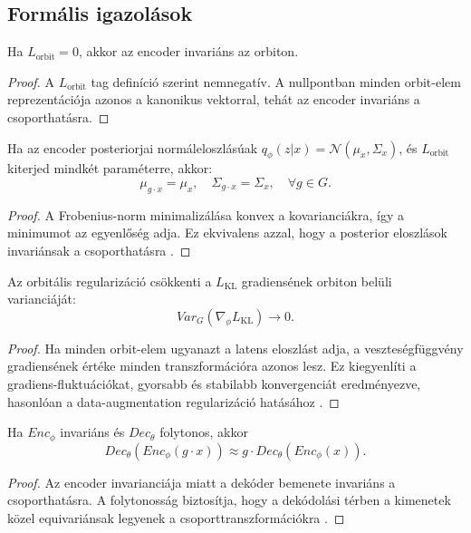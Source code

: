 \subsection{Formális igazolások}

\begin{proposition}
Ha \(L_{\text{orbit}} = 0\), akkor az encoder invariáns az orbiton.
\end{proposition}
\begin{proof}
A \(L_{\text{orbit}}\) tag definíció szerint nemnegatív.  
A nullpontban minden orbit-elem reprezentációja azonos a kanonikus vektorral, tehát az encoder invariáns a csoporthatásra.
\end{proof}

\begin{proposition}
Ha az encoder posteriorjai normáleloszlásúak \(q_\phi(z|x) = \mathcal{N}(\mu_x, \Sigma_x)\), és \(L_{\text{orbit}}\) kiterjed mindkét paraméterre, akkor:
\[
\mu_{g\cdot x} = \mu_x, \quad \Sigma_{g\cdot x} = \Sigma_x, \quad \forall g\in G.
\]
\end{proposition}
\begin{proof}
A Frobenius-norm minimalizálása konvex a kovarianciákra, így a minimumot az egyenlőség adja.  
Ez ekvivalens azzal, hogy a posterior eloszlások invariánsak a csoporthatásra \cite{Kondor2018, Cohen2016}.
\end{proof}

\begin{proposition}
Az orbitális regularizáció csökkenti a \(L_{\text{KL}}\) gradiensének orbiton belüli varianciáját:
\[
Var_G(\nabla_\phi L_{\text{KL}}) \to 0.
\]
\end{proposition}
\begin{proof}
Ha minden orbit-elem ugyanazt a latens eloszlást adja, a veszteségfüggvény gradiensének értéke minden transzformációra azonos lesz.  
Ez kiegyenlíti a gradiens-fluktuációkat, gyorsabb és stabilabb konvergenciát eredményezve, hasonlóan a data-augmentation regularizáció hatásához \cite{Hadjeres2017}.
\end{proof}

\begin{proposition}
Ha \(Enc_\phi\) invariáns és \(Dec_\theta\) folytonos, akkor
\[
Dec_\theta(Enc_\phi(g\cdot x)) \approx g\cdot Dec_\theta(Enc_\phi(x)).
\]
\end{proposition}
\begin{proof}
Az encoder invarianciája miatt a dekóder bemenete invariáns a csoporthatásra.  
A folytonosság biztosítja, hogy a dekódolási térben a kimenetek közel equivariánsak legyenek a csoporttranszformációkra \cite{Cohen2016}.
\end{proof}

